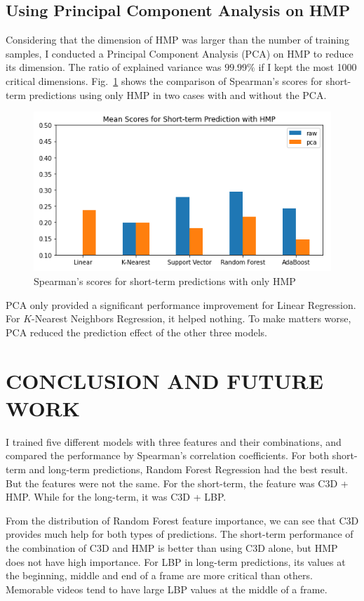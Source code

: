 \documentclass[conference, compsoc]{IEEEtran}
\begin{document}
{\subsection{Using Principal Component Analysis on HMP}
Considering that the dimension of HMP was larger than the number of training samples, I conducted a Principal Component Analysis (PCA) on HMP to reduce its dimension.
The ratio of explained variance was $99.99\%$ if I kept the most 1000 critical dimensions.
Fig.~\ref{fig:pca-short-spearman-scores} shows the comparison of Spearman's scores for short-term predictions using only HMP in two cases with and without the PCA.

\begin{figure}[htbp]
    \centerline{\includegraphics[width=\linewidth]{figures/pca-short-spearman-scores.png}}
    \caption{Spearman's scores for short-term predictions with only HMP}
    \label{fig:pca-short-spearman-scores}
\end{figure}

PCA only provided a significant performance improvement for Linear Regression.
For $K$-Nearest Neighbors Regression, it helped nothing.
To make matters worse, PCA reduced the prediction effect of the other three models.


\section{CONCLUSION AND FUTURE WORK}
I trained five different models with three features and their combinations, and compared the performance by Spearman's correlation coefficients.
For both short-term and long-term predictions, Random Forest Regression had the best result.
But the features were not the same.
For the short-term, the feature was C3D + HMP.
While for the long-term, it was C3D + LBP.

From the distribution of Random Forest feature importance, we can see that C3D provides much help for both types of predictions.
The short-term performance of the combination of C3D and HMP is better than using C3D alone, but HMP does not have high importance.
For LBP in long-term predictions, its values at the beginning, middle and end of a frame are more critical than others.
Memorable videos tend to have large LBP values at the middle of a frame.

}
\end{document}
